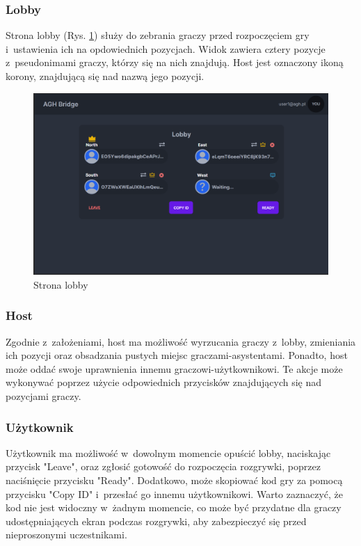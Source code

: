 \FloatBarrier

\subsubsection{Lobby}

Strona lobby (Rys. \ref{fig:lobby}) służy do zebrania graczy przed rozpoczęciem gry i~ustawienia ich 
na opdowiednich pozycjach. Widok zawiera cztery pozycje z~pseudonimami graczy,
którzy się na nich znajdują. Host jest oznaczony ikoną korony, znajdującą się nad nazwą 
jego pozycji.

\begin{figure}[h!]
  \centering
  \includegraphics[width=\textwidth]{img/widoki/lobby.png}
  \caption{Strona lobby}
  \label{fig:lobby}
\end{figure}

\FloatBarrier

\subsubsection{Host}

Zgodnie z~założeniami, host ma możliwość wyrzucania graczy z~lobby, zmieniania ich pozycji 
oraz obsadzania pustych miejsc graczami-asystentami. Ponadto, host może oddać swoje 
uprawnienia innemu graczowi-użytkownikowi. Te akcje może wykonywać poprzez użycie odpowiednich 
przycisków znajdujących się nad pozycjami graczy.

\subsubsection{Użytkownik}

Użytkownik ma możliwość w~dowolnym momencie opuścić lobby, naciskając przycisk "Leave", 
oraz zgłosić gotowość do rozpoczęcia rozgrywki, poprzez naciśnięcie przycisku "Ready". 
Dodatkowo, może skopiować kod gry za pomocą przycisku "Copy ID" i~przesłać go innemu 
użytkownikowi. Warto zaznaczyć, że kod nie jest widoczny w~żadnym momencie, co może być 
przydatne dla graczy udostępniających ekran podczas rozgrywki, aby zabezpieczyć się przed 
nieproszonymi uczestnikami.


